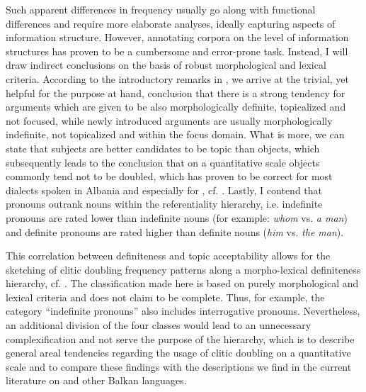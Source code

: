 \documentclass[output=paper]{langsci/langscibook}
\begin{document}
Such apparent differences in frequency usually go along with functional differences and require more elaborate analyses, ideally capturing aspects of information structure. However, annotating corpora on the level of information structures has proven to be a cumbersome and error-prone task. Instead, I will draw indirect conclusions on the basis of robust morphological and lexical criteria. According to the introductory remarks in , we arrive at the trivial, yet helpful for the purpose at hand, conclusion that there is a strong tendency for arguments which are given to be also morphologically definite, topicalized and not focused, while newly introduced arguments are usually morphologically indefinite, not topicalized and within the focus domain. What is more, we can state that subjects are better candidates to be topic than objects, which subsequently leads to the conclusion that on a quantitative scale objects commonly tend not to be doubled, which has proven to be correct for most dialects spoken in Albania and especially for , cf. . Lastly, I contend that pronouns outrank nouns within the referentiality hierarchy, i.e. indefinite pronouns are rated lower than indefinite nouns (for example: \textit{whom} vs. \textit{a man}) and definite pronouns are rated higher than definite nouns (\textit{him} vs. \textit{the man}).   

This correlation between definiteness and topic acceptability allows for the sketching of clitic doubling frequency patterns along a morpho-lexical definiteness hierarchy, cf. . The classification made here is based on purely morphological and lexical criteria and does not claim to be complete. Thus, for example, the category \enquote{indefinite pronouns} also includes interrogative pronouns. Nevertheless, an additional division of the four classes would lead to an unnecessary complexification and not serve the purpose of the hierarchy, which is to describe general areal tendencies regarding the usage of clitic doubling on a quantitative scale and to compare these findings with the descriptions we find in the current literature on  and other Balkan languages.

\begin{table}
\caption{Morpho-lexical definiteness hierarchy.\label{tab:matoshi:7}}
\end{table}
\end{document}
